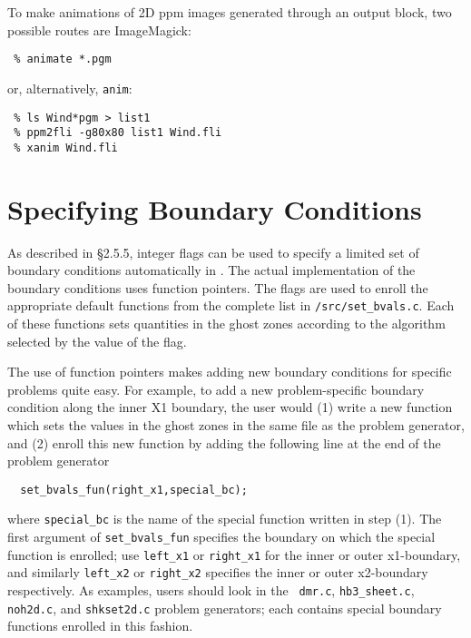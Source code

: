 To make animations of 2D ppm images generated through an output block,
two possible routes are ImageMagick:

\footnotesize
\begin{verbatim}
 % animate *.pgm
\end{verbatim}
\normalsize

or, alternatively, {\tt anim}:
\footnotesize
\begin{verbatim}
 % ls Wind*pgm > list1
 % ppm2fli -g80x80 list1 Wind.fli
 % xanim Wind.fli

\end{verbatim}
\normalsize

\section{Specifying Boundary Conditions}

As described in \S 2.5.5, integer flags can be used to specify a limited set
of boundary conditions automatically in \ath.  The actual implementation of
the boundary conditions uses function pointers.  The
flags are used to enroll the appropriate default 
functions from the complete list in {\tt /src/set\_bvals.c}.  Each of these
functions sets quantities in the ghost zones according to the 
algorithm selected by the value of the flag.

The use of function pointers makes adding new boundary conditions for specific
problems quite easy.  For example, to add a new problem-specific boundary
condition along the inner X1 boundary, the user would (1) write a new function
which sets the values in the ghost zones in the same
file as the problem generator, and (2) enroll this new function
by adding the following line at the end of the problem generator

\footnotesize
\begin{verbatim}
  set_bvals_fun(right_x1,special_bc);
\end{verbatim}
\normalsize

\noindent
where {\tt special\_bc} is the name of the special function written in
step (1).  The first argument of {\tt set\_bvals\_fun} specifies the
boundary on which the special function is enrolled; use {\tt left\_x1}
or {\tt right\_x1} for the inner or outer x1-boundary, and similarly
{\tt left\_x2} or {\tt right\_x2} specifies the inner or outer
x2-boundary respectively.  As examples, users should look in the {\tt
dmr.c}, {\tt hb3\_sheet.c}, {\tt noh2d.c}, and {\tt shkset2d.c}
problem generators; each contains special boundary functions enrolled
in this fashion.

